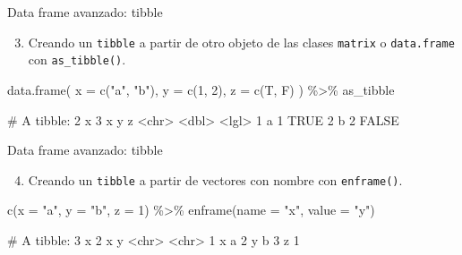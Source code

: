 \documentclass[
  ignorenonframetext,
  aspectratio=169]{beamer}
\newenvironment{Shaded}{\begin{snugshade}}{\end{snugshade}}
\newcommand{\AttributeTok}[1]{\textcolor[rgb]{0.77,0.63,0.00}{#1}}
\newcommand{\DecValTok}[1]{\textcolor[rgb]{0.00,0.00,0.81}{#1}}
\newcommand{\FunctionTok}[1]{\textcolor[rgb]{0.00,0.00,0.00}{#1}}
\newcommand{\NormalTok}[1]{#1}
\newcommand{\SpecialCharTok}[1]{\textcolor[rgb]{0.00,0.00,0.00}{#1}}
\newcommand{\StringTok}[1]{\textcolor[rgb]{0.31,0.60,0.02}{#1}}
\providecommand{\tightlist}{%
  \setlength{\itemsep}{0pt}\setlength{\parskip}{0pt}}
\let\oldverbatim\verbatim
\let\endoldverbatim\endverbatim
\renewenvironment{verbatim}{\tiny\oldverbatim}{\endoldverbatim}
\begin{document}
\begin{frame}[fragile]{Data frame avanzado: tibble}
\protect\hypertarget{data-frame-avanzado-tibble-2}{}
\begin{enumerate}
\setcounter{enumi}{2}
\tightlist
\item
  Creando un \texttt{tibble} a partir de otro objeto de las clases
  \texttt{matrix} o \texttt{data.frame} con \texttt{as\_tibble()}.
\end{enumerate}

\begin{Shaded}
\begin{Highlighting}[]
\FunctionTok{data.frame}\NormalTok{(}
  \AttributeTok{x =} \FunctionTok{c}\NormalTok{(}\StringTok{"a"}\NormalTok{, }\StringTok{"b"}\NormalTok{),}
  \AttributeTok{y =} \FunctionTok{c}\NormalTok{(}\DecValTok{1}\NormalTok{, }\DecValTok{2}\NormalTok{),}
  \AttributeTok{z =} \FunctionTok{c}\NormalTok{(T, F)}
\NormalTok{) }\SpecialCharTok{\%\textgreater{}\%} 
\NormalTok{as\_tibble}
\end{Highlighting}
\end{Shaded}

\begin{verbatim}
# A tibble: 2 x 3
  x         y z    
  <chr> <dbl> <lgl>
1 a         1 TRUE 
2 b         2 FALSE
\end{verbatim}
\end{frame}

\begin{frame}[fragile]{Data frame avanzado: tibble}
\protect\hypertarget{data-frame-avanzado-tibble-3}{}
\begin{enumerate}
\setcounter{enumi}{3}
\tightlist
\item
  Creando un \texttt{tibble} a partir de vectores con nombre con
  \texttt{enframe()}.
\end{enumerate}

\begin{Shaded}
\begin{Highlighting}[]
\FunctionTok{c}\NormalTok{(}\AttributeTok{x =} \StringTok{"a"}\NormalTok{, }\AttributeTok{y =} \StringTok{"b"}\NormalTok{, }\AttributeTok{z =} \DecValTok{1}\NormalTok{) }\SpecialCharTok{\%\textgreater{}\%}
  \FunctionTok{enframe}\NormalTok{(}\AttributeTok{name =} \StringTok{"x"}\NormalTok{, }\AttributeTok{value =} \StringTok{"y"}\NormalTok{)}
\end{Highlighting}
\end{Shaded}

\begin{verbatim}
# A tibble: 3 x 2
  x     y    
  <chr> <chr>
1 x     a    
2 y     b    
3 z     1    
\end{verbatim}
\end{frame}
\end{document}
